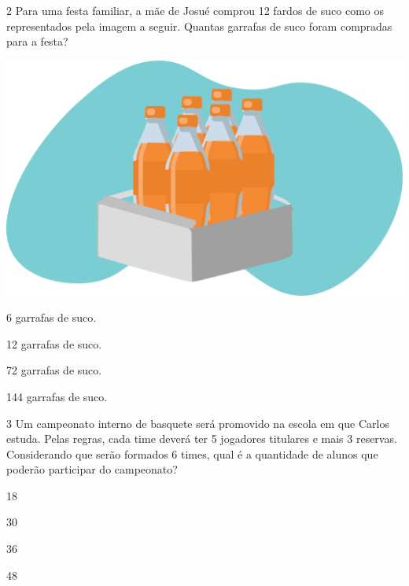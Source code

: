 \num{2} Para uma festa familiar, a mãe de Josué comprou 12 fardos de
suco como os representados pela imagem a seguir. Quantas garrafas de suco foram compradas para a festa? 

\begin{minipage}{.5\textwidth}
\includegraphics[width=\textwidth]{./media/image26.png}
\end{minipage}
\begin{minipage}{.5\textwidth}
\begin{escolha}
\item
  6 garrafas de suco.
\item
  12 garrafas de suco.
\item
  72 garrafas de suco.
\item
  144 garrafas de suco.
\end{escolha}
\end{minipage}

\num{3} Um campeonato interno de basquete será promovido na escola em que Carlos
estuda. Pelas regras, cada time deverá ter 5 jogadores titulares e mais 3 reservas. Considerando que serão formados 6 times, qual é a quantidade de alunos que poderão participar do campeonato?

\begin{escolha}
\item
  18
\item
  30
\item
  36
\item
  48
\end{escolha}

